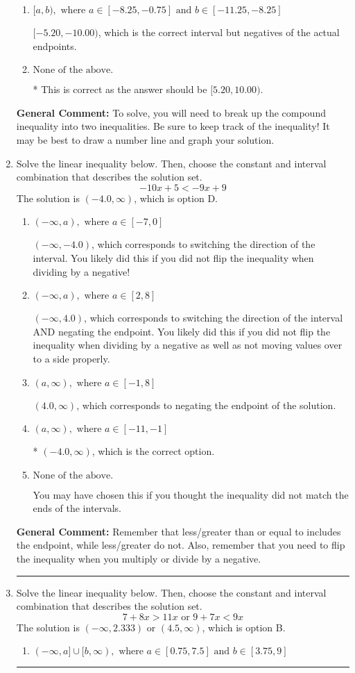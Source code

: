 \documentclass{extbook}[14pt]
\newcommand{\litem}[1]{\item #1

\rule{\textwidth}{0.4pt}}
\begin{document}
\begin{enumerate}
{\begin{enumerate}[label=\Alph*.]
$(-\infty, -5.20] \cup (-10.00, \infty)$, which corresponds to displaying the and-inequality as an or-inequality and getting negatives of the actual endpoints.
\item \( [a, b), \text{ where } a \in [-8.25, -0.75] \text{ and } b \in [-11.25, -8.25] \)

$[-5.20, -10.00)$, which is the correct interval but negatives of the actual endpoints.
\item \( \text{None of the above.} \)

* This is correct as the answer should be $[5.20, 10.00)$.
\end{enumerate}

\textbf{General Comment:} To solve, you will need to break up the compound inequality into two inequalities. Be sure to keep track of the inequality! It may be best to draw a number line and graph your solution.
}
\litem{
Solve the linear inequality below. Then, choose the constant and interval combination that describes the solution set.
\[ -10x + 5 < -9x + 9 \]The solution is \( (-4.0, \infty) \), which is option D.\begin{enumerate}[label=\Alph*.]
\item \( (-\infty, a), \text{ where } a \in [-7, 0] \)

 $(-\infty, -4.0)$, which corresponds to switching the direction of the interval. You likely did this if you did not flip the inequality when dividing by a negative!
\item \( (-\infty, a), \text{ where } a \in [2, 8] \)

 $(-\infty, 4.0)$, which corresponds to switching the direction of the interval AND negating the endpoint. You likely did this if you did not flip the inequality when dividing by a negative as well as not moving values over to a side properly.
\item \( (a, \infty), \text{ where } a \in [-1, 8] \)

 $(4.0, \infty)$, which corresponds to negating the endpoint of the solution.
\item \( (a, \infty), \text{ where } a \in [-11, -1] \)

* $(-4.0, \infty)$, which is the correct option.
\item \( \text{None of the above}. \)

You may have chosen this if you thought the inequality did not match the ends of the intervals.
\end{enumerate}

\textbf{General Comment:} Remember that less/greater than or equal to includes the endpoint, while less/greater do not. Also, remember that you need to flip the inequality when you multiply or divide by a negative.
}
\litem{
Solve the linear inequality below. Then, choose the constant and interval combination that describes the solution set.
\[ 7 + 8 x > 11 x \text{ or } 9 + 7 x < 9 x \]The solution is \( (-\infty, 2.333) \text{ or } (4.5, \infty) \), which is option B.\begin{enumerate}[label=\Alph*.]
\item \( (-\infty, a] \cup [b, \infty), \text{ where } a \in [0.75, 7.5] \text{ and } b \in [3.75, 9] \)


\end{enumerate}}
\end{enumerate}
\end{document}
